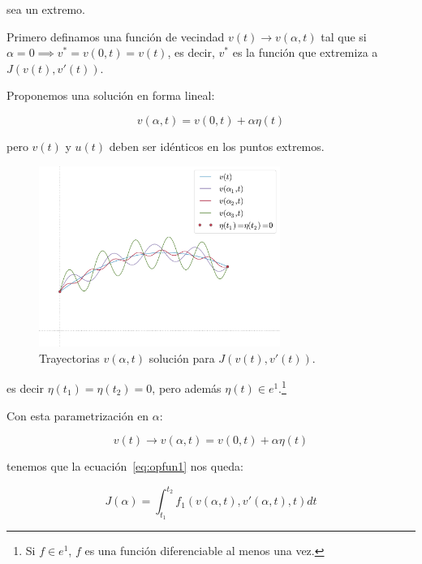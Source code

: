         sea un extremo.

        Primero definamos una función de vecindad $v(t) \to v(\alpha, t)$ tal que si $\alpha = 0 \implies v^* = v(0, t) = v(t)$, es decir, $v^*$ es la función que extremiza a $J(v(t), v'(t))$.

        Proponemos una solución en forma lineal:

        \begin{equation}
            v(\alpha, t) = v(0, t) + \alpha \eta(t)
        \end{equation}

        pero $v(t)$ y $u(t)$ deben ser idénticos en los puntos extremos.

        \begin{figure}
            \centering
            \includegraphics[width=0.7\textwidth]{./imagenes/trayectorias.pdf}
            \caption{\label{fig:trayectorias}Trayectorias $v(\alpha, t)$ solución para $J(v(t), v'(t))$.}
        \end{figure}

        es decir $\eta(t_1) = \eta(t_2) = 0$, pero además $\eta(t) \in e^1$.\footnote{Si $f \in e^1$, $f$ es una función diferenciable al menos una vez.}

        Con esta parametrización en $\alpha$:

        \begin{equation*}
            v(t) \to v(\alpha, t) = v(0, t) + \alpha \eta(t)
        \end{equation*}

        tenemos que la ecuación~\ref{eq:opfun1} nos queda:

        \begin{equation*}
            J(\alpha) = \int_{t_1}^{t_2} f_1(v(\alpha, t), v'(\alpha, t), t) dt
        \end{equation*}

